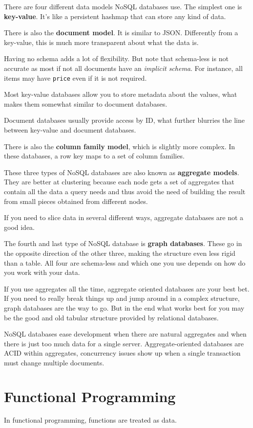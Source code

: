 \documentclass[oneside]{book} %
\theoremstyle{plain}
\begin{document}
There are four different data models NoSQL databases use.
The simplest one is \textbf{key-value}. It's like a persistent hashmap that can
store any kind of data.

There is also the \textbf{document model}. It is similar to JSON. Differently
from a key-value, this is much more transparent about what the data is.

Having no schema adds a lot of flexibility. But note that schema-less is not
accurate as most if not all documents have an \textit{implicit schema}. For
instance, all items may have \texttt{price} even if it is not required.

Most key-value databases allow you to store metadata about the values, what
makes them somewhat similar to document databases.

Document databases usually provide access by ID, what further blurries the line
between key-value and document databases.

There is also the \textbf{column family model}, which is slightly more complex.
In these databases, a row key maps to a set of column families.

These three types of NoSQL databases are also known as \textbf{aggregate
models}. They are better at clustering because each node gets a set of
aggregates that contain all the data a query needs and thus avoid the need of
building the result from small pieces obtained from different nodes.

If you need to slice data in several different ways, aggregate databases are not
a good idea.

The fourth and last type of NoSQL database is \textbf{graph databases}. These go
in the opposite direction of the other three, making the structure even less
rigid than a table. All four are schema-less and which one you use depends on
how do you work with your data.

If you use aggregates all the time, aggregate oriented databases are your best
bet. If you need to really break things up and jump around in a complex
structure, graph databases are the way to go. But in the end what works best for
you may be the good and old tabular structure provided by relational databases.

NoSQL databases ease development when there are natural aggregates and when
there is just too much data for a single server.
Aggregate-oriented databases are ACID within aggregates, concurrency issues show
up when a single transaction must change multiple documents.


\chapter{Functional Programming}
In functional programming, functions are treated as data.

\end{document}
